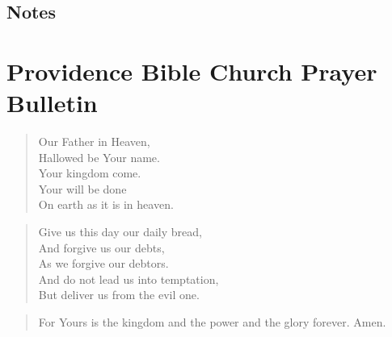 \documentclass[12pt,twocolumn]{article}
\newcommand{\B}{\begin{description}}
\newcommand{\E}{\end{description}}
\newcommand{\Q}[1]{\parbox{\columnwidth}{\begin{quote} #1 \end{quote}}}
\begin{document}
\subsection*{Notes}
\pagebreak
\section*{Providence Bible Church Prayer Bulletin}
\Q{ Our Father in Heaven, \\
    Hallowed be Your name. \\
    Your kingdom come. \\
    Your will be done \\
    On earth as it is in heaven.} 
\B
\E

\Q{ Give us this day our daily bread, \\
    And forgive us our debts, \\
    As we forgive our debtors. \\
    And do not lead us into temptation, \\
    But deliver us from the evil one.}
\B
\E

\Q{ For Yours is the kingdom and the power and the glory forever. Amen.}
\end{document}

